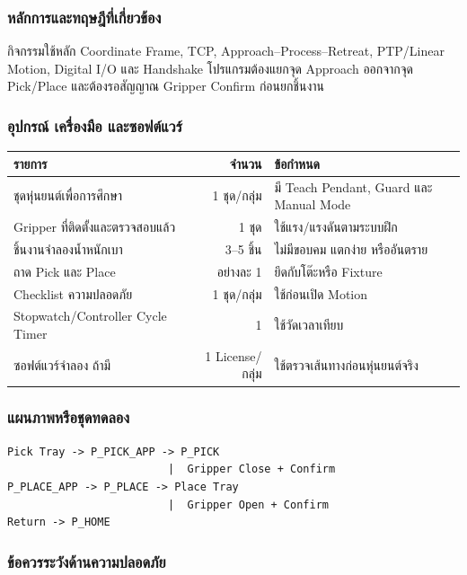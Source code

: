 \subsubsection{หลักการและทฤษฎีที่เกี่ยวข้อง}

กิจกรรมใช้หลัก Coordinate Frame, TCP, Approach–Process–Retreat, PTP/Linear Motion, Digital I/O และ Handshake โปรแกรมต้องแยกจุด Approach ออกจากจุด Pick/Place และต้องรอสัญญาณ Gripper Confirm ก่อนยกชิ้นงาน

\subsubsection{อุปกรณ์ เครื่องมือ และซอฟต์แวร์}

\begin{table}[htbp]
    \centering
    \begin{tabular}{l r l}
        \hline
        \textbf{รายการ} & \textbf{จำนวน} & \textbf{ข้อกำหนด} \\
        \hline
        ชุดหุ่นยนต์เพื่อการศึกษา & 1 ชุด/กลุ่ม & มี Teach Pendant, Guard และ Manual Mode \\
        Gripper ที่ติดตั้งและตรวจสอบแล้ว & 1 ชุด & ใช้แรง/แรงดันตามระบบฝึก \\
        ชิ้นงานจำลองน้ำหนักเบา & 3–5 ชิ้น & ไม่มีขอบคม แตกง่าย หรืออันตราย \\
        ถาด Pick และ Place & อย่างละ 1 & ยึดกับโต๊ะหรือ Fixture \\
        Checklist ความปลอดภัย & 1 ชุด/กลุ่ม & ใช้ก่อนเปิด Motion \\
        Stopwatch/Controller Cycle Timer & 1 & ใช้วัดเวลาเทียบ \\
        ซอฟต์แวร์จำลอง ถ้ามี & 1 License/กลุ่ม & ใช้ตรวจเส้นทางก่อนหุ่นยนต์จริง \\
        \hline
    \end{tabular}
\end{table}

\subsubsection{แผนภาพหรือชุดทดลอง}

\begin{verbatim}
Pick Tray -> P_PICK_APP -> P_PICK
                         |  Gripper Close + Confirm
P_PLACE_APP -> P_PLACE -> Place Tray
                         |  Gripper Open + Confirm
Return -> P_HOME
\end{verbatim}

\subsubsection{ข้อควรระวังด้านความปลอดภัย}

